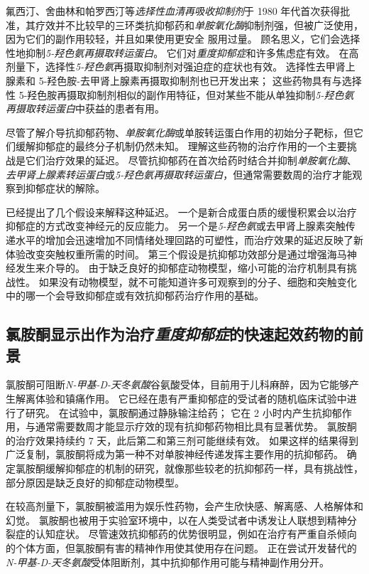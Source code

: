 氟西汀、舍曲林和帕罗西汀等\textit{选择性血清再吸收抑制剂}于 1980 年代首次获得批准，其疗效并不比较早的三环类抗抑郁药和\textit{单胺氧化酶}抑制剂强，但被广泛使用，因为它们的副作用较轻，并且如果使用更安全 服用过量。
顾名思义，它们会选择性地抑制\textit{5-羟色氨再摄取转运蛋白}。
它们对\textit{重度抑郁症}和许多焦虑症有效。
在高剂量下，选择性\textit{5-羟色氨}再摄取抑制剂对强迫症的症状也有效。
选择性去甲肾上腺素和 5-羟色胺-去甲肾上腺素再摄取抑制剂也已开发出来；
这些药物具有与选择性 5-羟色胺再摄取抑制剂相似的副作用特征，但对某些不能从单独抑制\textit{5-羟色氨再摄取转运蛋白}中获益的患者有用。


尽管了解介导抗抑郁药物、\textit{单胺氧化酶}或单胺转运蛋白作用的初始分子靶标，但它们缓解抑郁症的最终分子机制仍然未知。
理解这些药物的治疗作用的一个主要挑战是它们治疗效果的延迟。
尽管抗抑郁药在首次给药时结合并抑制\textit{单胺氧化酶}、\textit{去甲肾上腺素转运蛋白}或\textit{5-羟色氨再摄取转运蛋白}，但通常需要数周的治疗才能观察到抑郁症状的解除。


已经提出了几个假设来解释这种延迟。
一个是新合成蛋白质的缓慢积累会以治疗抑郁症的方式改变神经元的反应能力。
另一个是\textit{5-羟色氨}或去甲肾上腺素突触传递水平的增加会迅速增加不同情绪处理回路的可塑性，而治疗效果的延迟反映了新体验改变突触权重所需的时间。
第三个假设是抗抑郁功效部分是通过增强海马神经发生来介导的。
由于缺乏良好的抑郁症动物模型，缩小可能的治疗机制具有挑战性。
如果没有动物模型，就不可能知道许多可观察到的分子、细胞和突触变化中的哪一个会导致抑郁症或有效抗抑郁药治疗作用的基础。



\subsection{氯胺酮显示出作为治疗\textit{重度抑郁症}的快速起效药物的前景}

氯胺酮可阻断\textit{N-甲基-D-天冬氨酸}谷氨酸受体，目前用于儿科麻醉，因为它能够产生解离体验和镇痛作用。
它已经在患有严重抑郁症的受试者的随机临床试验中进行了研究。
在试验中，氯胺酮通过静脉输注给药；
它在 2 小时内产生抗抑郁作用，与通常需要数周才能显示疗效的现有抗抑郁药物相比具有显著优势。
氯胺酮的治疗效果持续约 7 天，此后第二和第三剂可能继续有效。
如果这样的结果得到广泛复制，氯胺酮将成为第一种不对单胺神经传递发挥主要作用的抗抑郁药。
确定氯胺酮缓解抑郁症的机制的研究，就像那些较老的抗抑郁药一样，具有挑战性，部分原因是缺乏良好的抑郁症动物模型。


在较高剂量下，氯胺酮被滥用为娱乐性药物，会产生欣快感、解离感、人格解体和幻觉。
氯胺酮也被用于实验室环境中，以在人类受试者中诱发让人联想到精神分裂症的认知症状。
尽管速效抗抑郁药的优势很明显，例如在治疗有严重自杀倾向的个体方面，但氯胺酮有害的精神作用使其使用存在问题。
正在尝试开发替代的\textit{N-甲基-D-天冬氨酸}受体阻断剂，其中抗抑郁作用可能与精神副作用分开。



